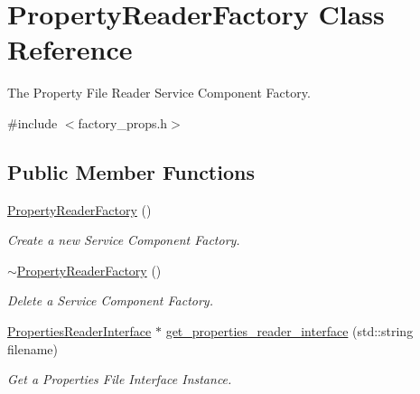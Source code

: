 \hypertarget{classPropertyReaderFactory}{}\section{Property\+Reader\+Factory Class Reference}
\label{classPropertyReaderFactory}


The Property File Reader Service Component Factory.  




{\ttfamily \#include $<$factory\+\_\+props.\+h$>$}

\subsection*{Public Member Functions}
\begin{DoxyCompactItemize}
\item 
\hyperlink{classPropertyReaderFactory_a0248347551aa31756cf3103a6677a1cb}{Property\+Reader\+Factory} ()\hypertarget{classPropertyReaderFactory_a0248347551aa31756cf3103a6677a1cb}{}\label{classPropertyReaderFactory_a0248347551aa31756cf3103a6677a1cb}

\begin{DoxyCompactList}\small\item\em Create a new Service Component Factory. \end{DoxyCompactList}\item 
\hyperlink{classPropertyReaderFactory_a9479b2681b7b0eb1332aa03715e4c34c}{$\sim$\+Property\+Reader\+Factory} ()\hypertarget{classPropertyReaderFactory_a9479b2681b7b0eb1332aa03715e4c34c}{}\label{classPropertyReaderFactory_a9479b2681b7b0eb1332aa03715e4c34c}

\begin{DoxyCompactList}\small\item\em Delete a Service Component Factory. \end{DoxyCompactList}\item 
\hyperlink{classPropertiesReaderInterface}{Properties\+Reader\+Interface} $\ast$ \hyperlink{classPropertyReaderFactory_a45379e69c4a5a247233cdb17a32f3d1e}{get\+\_\+properties\+\_\+reader\+\_\+interface} (std\+::string filename)\hypertarget{classPropertyReaderFactory_a45379e69c4a5a247233cdb17a32f3d1e}{}\label{classPropertyReaderFactory_a45379e69c4a5a247233cdb17a32f3d1e}

\begin{DoxyCompactList}\small\item\em Get a Properties File Interface Instance. \end{DoxyCompactList}\end{DoxyCompactItemize}


